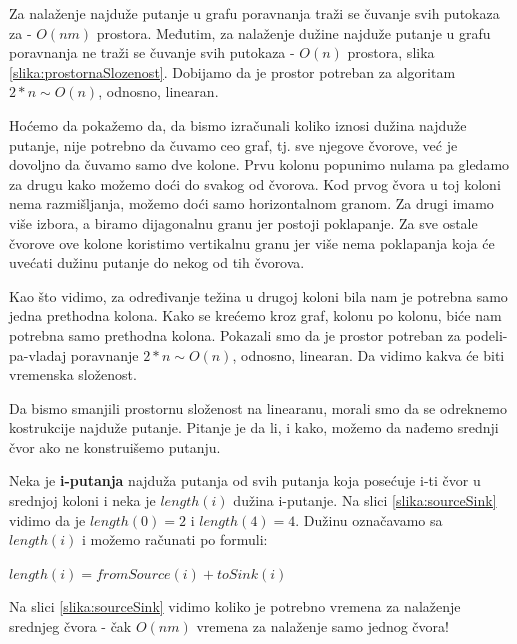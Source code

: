 Za nalaženje najduže putanje u grafu poravnanja traži se čuvanje svih putokaza za - $O(nm)$ prostora. Međutim, za nalaženje dužine najduže putanje u grafu poravnanja ne traži se čuvanje svih putokaza - $O(n)$ prostora, slika \ref{slika:prostornaSlozenost}. Dobijamo da je prostor potreban za algoritam $2*n \sim O(n)$, odnosno, linearan. 

Hoćemo da pokažemo da, da bismo izračunali koliko iznosi dužina najduže putanje, nije potrebno da čuvamo ceo graf, tj. sve njegove čvorove, već je dovoljno da čuvamo samo dve kolone. Prvu kolonu popunimo nulama pa gledamo za drugu kako možemo doći do svakog od čvorova. Kod prvog čvora u toj koloni nema razmišljanja, možemo doći samo horizontalnom granom. Za drugi imamo više izbora, a biramo dijagonalnu granu jer postoji poklapanje. Za sve ostale čvorove ove kolone koristimo vertikalnu granu jer više nema poklapanja koja će uvećati dužinu putanje do nekog od tih čvorova. 

Kao što vidimo, za određivanje težina u drugoj koloni bila nam je potrebna samo jedna prethodna kolona. Kako se krećemo kroz graf, kolonu po kolonu, biće nam potrebna samo prethodna kolona. Pokazali smo da je prostor potreban za podeli-pa-vladaj poravnanje $2*n \sim  O(n)$, odnosno, linearan. Da vidimo kakva će biti vremenska složenost.


Da bismo smanjili prostornu složenost na linearanu, morali smo da se odreknemo kostrukcije najduže putanje. Pitanje je da li, i kako, možemo da nađemo srednji čvor ako ne konstruišemo putanju.

Neka je \textbf{i-putanja} najduža putanja od svih putanja koja posećuje i-ti čvor u srednjoj koloni i neka je \textbf{$length(i)$} dužina i-putanje. Na slici \ref{slika:sourceSink} vidimo da je $length(0)=2$ i $length(4)=4$. Dužinu označavamo sa $length(i)$ i možemo računati po formuli:
\begin{center}
$length(i) = fromSource(i) + toSink(i)$
\end{center}


Na slici \ref{slika:sourceSink} vidimo koliko je potrebno vremena za nalaženje srednjeg čvora - čak $O(nm)$ vremena za nalaženje samo jednog čvora! 



